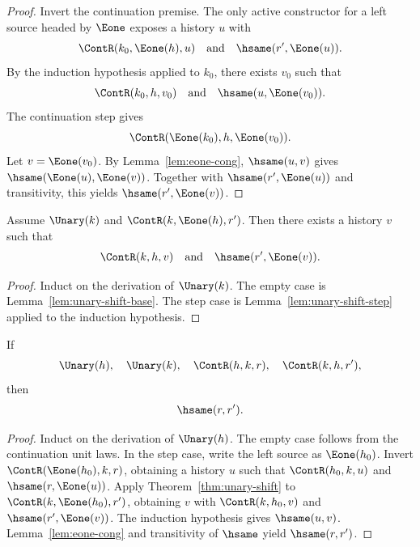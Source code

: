 \begin{proof}
Invert the continuation premise. The only active constructor for a left source headed by \(\Eone\) exposes a history \(u\) with
$$
  \ContR(k_0,\Eone(h),u)
  \quad\text{and}\quad
  \hsame(r',\Eone(u)).
$$
By the induction hypothesis applied to \(k_0\), there exists \(v_0\) such that
$$
  \ContR(k_0,h,v_0)
  \quad\text{and}\quad
  \hsame(u,\Eone(v_0)).
$$
The continuation step gives
$$
  \ContR(\Eone(k_0),h,\Eone(v_0)).
$$
Let \(v=\Eone(v_0)\). By Lemma~\ref{lem:eone-cong}, \(\hsame(u,v)\) gives \(\hsame(\Eone(u),\Eone(v))\). Together with \(\hsame(r',\Eone(u))\) and transitivity, this yields \(\hsame(r',\Eone(v))\).
\end{proof}

\begin{theorem}
\label{thm:unary-shift}
Assume \(\Unary(k)\) and \(\ContR(k,\Eone(h),r')\). Then there exists a history \(v\) such that
$$
  \ContR(k,h,v)
  \quad\text{and}\quad
  \hsame(r',\Eone(v)).
$$
\end{theorem}

\begin{proof}
Induct on the derivation of \(\Unary(k)\). The empty case is Lemma~\ref{lem:unary-shift-base}. The step case is Lemma~\ref{lem:unary-shift-step} applied to the induction hypothesis.
\end{proof}

\begin{theorem}
\label{thm:unary-commutativity-refined}
If
$$
  \Unary(h),\quad \Unary(k),\quad
  \ContR(h,k,r),\quad \ContR(k,h,r'),
$$
then
$$
  \hsame(r,r').
$$
\end{theorem}

\begin{proof}
Induct on the derivation of \(\Unary(h)\). The empty case follows from the continuation unit laws. In the step case, write the left source as \(\Eone(h_0)\). Invert \(\ContR(\Eone(h_0),k,r)\), obtaining a history \(u\) such that \(\ContR(h_0,k,u)\) and \(\hsame(r,\Eone(u))\). Apply Theorem~\ref{thm:unary-shift} to \(\ContR(k,\Eone(h_0),r')\), obtaining \(v\) with \(\ContR(k,h_0,v)\) and \(\hsame(r',\Eone(v))\). The induction hypothesis gives \(\hsame(u,v)\). Lemma~\ref{lem:eone-cong} and transitivity of \(\hsame\) yield \(\hsame(r,r')\).
\end{proof}

